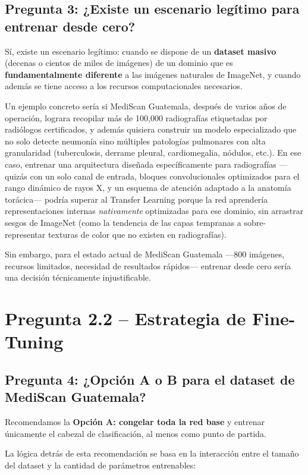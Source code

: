 \documentclass[12pt, letterpaper]{article}
\begin{document}
\subsection{Pregunta 3: ¿Existe un escenario legítimo para entrenar desde cero?}

Sí, existe un escenario legítimo: cuando se dispone de un \textbf{dataset masivo} (decenas o
cientos de miles de imágenes) de un dominio que es \textbf{fundamentalmente diferente} a las
imágenes naturales de ImageNet, y cuando además se tiene acceso a los recursos computacionales
necesarios.

Un ejemplo concreto sería si MediScan Guatemala, después de varios años de operación, lograra
recopilar más de 100,000 radiografías etiquetadas por radiólogos certificados, y además quisiera
construir un modelo especializado que no solo detecte neumonía sino múltiples patologías
pulmonares con alta granularidad (tuberculosis, derrame pleural, cardiomegalia, nódulos, etc.).
En ese caso, entrenar una arquitectura diseñada específicamente para radiografías ---quizás
con un solo canal de entrada, bloques convolucionales optimizados para el rango dinámico de
rayos X, y un esquema de atención adaptado a la anatomía torácica--- podría superar al Transfer
Learning porque la red aprendería representaciones internas \textit{nativamente} optimizadas
para ese dominio, sin arrastrar sesgos de ImageNet (como la tendencia de las capas tempranas
a sobre-representar texturas de color que no existen en radiografías).

Sin embargo, para el estado actual de MediScan Guatemala ---800 imágenes, recursos limitados,
necesidad de resultados rápidos--- entrenar desde cero sería una decisión técnicamente
injustificable.

\section{Pregunta 2.2 -- Estrategia de Fine-Tuning}

\subsection{Pregunta 4: ¿Opción A o B para el dataset de MediScan Guatemala?}

Recomendamos la \textbf{Opción A: congelar toda la red base} y entrenar únicamente el cabezal
de clasificación, al menos como punto de partida.

La lógica detrás de esta recomendación se basa en la interacción entre el tamaño del dataset
y la cantidad de parámetros entrenables:
\end{document}
